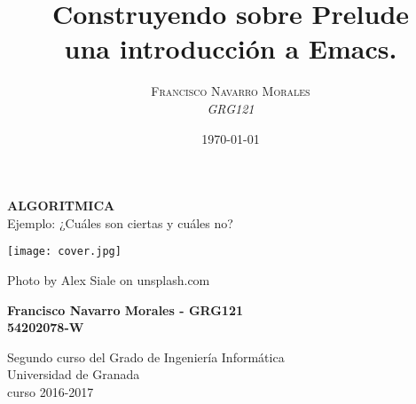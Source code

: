 \documentclass[a4paper, 11pt]{article}
\title{\textbf{Construyendo sobre Prelude}\\ %
					una introducción a Emacs.} %
\author{\textsc{Francisco Navarro Morales} %
\\{\textit{GRG121}}} %
\date{\today} %
\makeatletter
\renewcommand{\maketitle}{
  \begin{flushright} %
  
  {\LARGE\@title} %
  
  \vspace{50pt} %
  
  {\large\@author} %
  \\\@date %
  \vspace{40pt} %
  \end{flushright}
}
\makeatother
\begin{document}
	
	
	\begin{titlepage}
		\begin{center}
			\vspace*{2cm}
			
			{\Huge \textbf{ALGORITMICA} \\ Ejemplo: ¿Cuáles son ciertas y cuáles no?}
			
			
			\vspace{0.5cm}
			
			
		    \texttt{[image: cover.jpg]}
		    
		    
		    {\footnotesize Photo by Alex Siale on unsplash.com}
			
			\vspace{2cm}
			
			\textbf{Francisco Navarro Morales - GRG121 \\ 54202078-W }
			
			\vfill
			
			Segundo curso del Grado de Ingeniería Informática\\
			Universidad de Granada\\
			curso 2016-2017\\
			
		\end{center}
	\end{titlepage}



\renewcommand{\abstractname}{Resumen} %





\pagebreak
\end{document}
